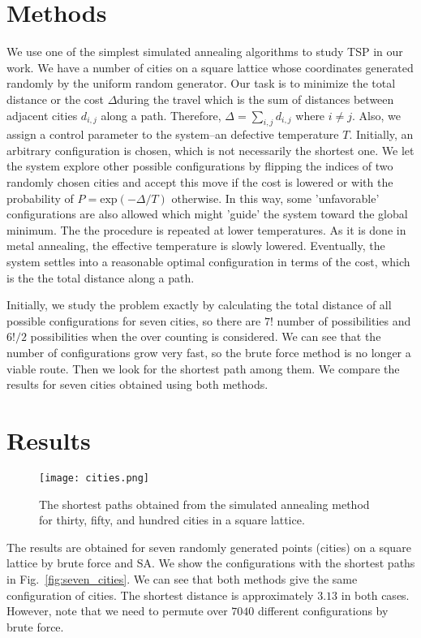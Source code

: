 \documentclass[aps,prb,twocolumn,showpacs,floatfix,superscriptaddress]{revtex4-1}
\begin{document}
\section{Methods}
We use one of the simplest simulated annealing algorithms to study TSP in our work. We have a number of cities on a square lattice whose coordinates generated randomly by the uniform random generator. Our task is to minimize the total distance or the cost $\Delta $during the travel which is the sum of distances between adjacent cities $d_{i,j}$ along a path. Therefore, $\Delta = \sum_{i,j}d_{i,j}$ where $i \neq j $. Also, we assign a control parameter to the system--an defective temperature $T$. Initially, an arbitrary configuration is chosen, which is not necessarily the shortest one. We let the system explore other possible configurations by flipping the indices of two randomly chosen cities and accept this move if the cost is lowered or with the probability of $P=\mathrm{exp}(-\Delta/T)$ otherwise. In this way, some 'unfavorable' configurations are also allowed which might 'guide' the system toward the global minimum. The the procedure is repeated at lower temperatures. As it is done in metal annealing, the effective temperature is slowly lowered. Eventually, the system settles into a reasonable optimal configuration in terms of the cost, which is the the total distance along a path. 

Initially, we study the problem exactly by calculating the total distance of all possible configurations for seven cities, so there are $7!$ number of possibilities and $6!/2$ possibilities when the over counting is considered. We can see that the number of configurations grow very fast, so the brute force method is no longer a viable route. Then we look for the shortest path among them. We compare the results for seven cities obtained using both methods. 

\section{Results}
\begin{figure*}
        \texttt{[image: cities.png]}
        \caption{The shortest paths obtained from the simulated annealing method for thirty, fifty, and hundred cities in a square lattice.}
        \label{fig:cities}
\end{figure*}

The results are obtained for seven randomly generated points (cities) on a square lattice by brute force and SA. We show the configurations with the shortest paths in Fig.~\ref{fig:seven_cities}. We can see that both methods give the same configuration of cities. The shortest distance is approximately $3.13$ in both cases. However, note that we need to permute over $7040$ different configurations by brute force.
\end{document}
